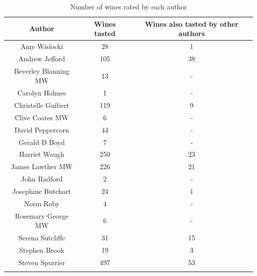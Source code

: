 \begin{table}[ht]
    \caption{Number of wines rated by each author}
    \centering
    \begin{tabular}{c c c}
        \\\hline\hline
        Author               & Wines tasted & Wines also tasted by other authors
        \\\hline
        Amy Wislocki         &           28 & 1  \\
        Andrew Jefford       &          105 & 38 \\
        Beverley Blanning MW &           13 & -  \\
        Carolyn Holmes       &            1 & -  \\
        Christelle Guibert   &          119 & 9  \\
        Clive Coates MW      &            6 & -  \\
        David Peppercorn     &           44 & -  \\
        Gerald D Boyd        &            7 & -  \\
        Harriet Waugh        &          250 & 23 \\
        James Lawther MW     &          226 & 21 \\
        John Radford         &            2 & -  \\
        Josephine Butchart   &           24 & 1  \\
        Norm Roby            &            4 & -  \\
        Rosemary George MW   &            6 & -  \\
        Serena Sutcliffe     &           31 & 15 \\
        Stephen Brook        &           19 & 3  \\
        Steven Spurrier      &          497 & 53 \\
        \\\hline
    \end{tabular}
    \label{table:authors}
\end{table}

